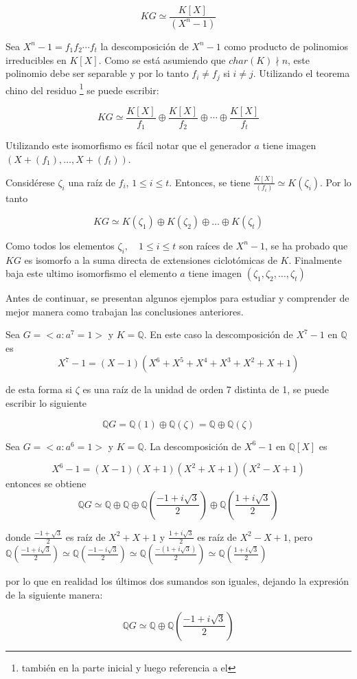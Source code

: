 \[KG \simeq \frac{K[X]}{(X^n -1 )} \]

Sea $ X^n -1 = f_1f_2\cdots f_t$ la descomposición de $X^n -1$ como producto de polinomios irreducibles en $K[X]$. Como se está asumiendo que $char(K) \nmid n$, este polinomio debe ser separable y por lo tanto $f_i \neq f_j$ si $i \neq j$. Utilizando el teorema chino del residuo \footnote{también en la parte inicial y luego referencia a el} se puede escribir:

\[KG \simeq \frac{K[X]}{f_1} \oplus \frac{K[X]}{f_2} \oplus \cdots \oplus \frac{K[X]}{f_t} \]


Utilizando este isomorfismo es fácil notar que el generador $a$ tiene imagen $( X + (f_1)  , \dots, X + (f_t) ) $. 

Considérese $\zeta_i$ una raíz de $f_i$, $1 \leq i \leq t$. Entonces, se tiene $\frac{K[X]}{(f_i)} \simeq K(\zeta_i)$. Por lo tanto

\[ KG \simeq K(\zeta_1) \oplus K(\zeta_2) \oplus \dots \oplus K(\zeta_t)  \]

Como todos los elementos $\zeta_i , \quad 1 \leq i \leq t$ son raíces de $X^n -1$, se ha probado que $KG$ es isomorfo a la suma directa de extensiones ciclotómicas de $K$. Finalmente baja este 
ultimo isomorfismo el elemento $a$ tiene imagen $(\zeta_1 , \zeta_2, \dots ,\zeta_t)$

Antes de continuar, se presentan algunos ejemplos para estudiar y comprender de mejor manera como trabajan las conclusiones anteriores.

\begin{ejemplo}\label{ejem:orden7}
Sea $G = < a \colon a^7 = 1>$ y $K = \mathds{Q} $. 
En este caso la descomposición de $ X^7 -1$ en $\mathds{Q}$ es 
\[ X^7 -1 = (X-1)(X^6 + X^5 + X^4 + X^3 + X^2 + X + 1) \]

de esta forma si $\zeta$ es una raíz de la unidad de orden 7 distinta de 1, se puede escribir lo siguiente

\[  \mathds{Q}G = \mathds{Q}(1) \oplus \mathds{Q}(\zeta) = \mathds{Q} \oplus \mathds{Q}(\zeta)   \]
\end{ejemplo}

\begin{ejemplo}
Sea $G = < a \colon a^6 = 1 >$ y $K = \mathds{Q}$. La descomposición de $X^6 - 1 $ en $\mathds{Q}[X]$ es 

\[ X^6 - 1 = (X-1)(X+1)(X^2 + X + 1)(X^2-X+1) \]
entonces se obtiene 
\[  \mathds{Q}G \simeq \mathds{Q} \oplus \mathds{Q} \oplus \mathds{Q}\left( \frac{-1+i\sqrt{3}}{2} \right) \oplus \mathds{Q}\left( \frac{1+i\sqrt{3}}{2} \right)   \]

donde $\frac{-1 + \sqrt{3}}{2}$ es raíz de $X^2+X+1$ y $\frac{1+i\sqrt{3}}{2}$ es raíz de $X^2-X+1$, pero $\mathds{Q}\left( \frac{-1+i\sqrt{3}}{2} \right) \simeq \mathds{Q}\left( \frac{-1-i\sqrt{3}}{2} \right) \simeq \mathds{Q}\left( \frac{-(1+i\sqrt{3})}{2} \right) \simeq \mathds{Q}\left( \frac{1+i\sqrt{3}}{2} \right)$

por lo que en realidad los últimos dos sumandos son iguales, dejando la expresión de la siguiente manera:

\[  \mathds{Q}G \simeq  \mathds{Q} \oplus \mathds{Q}\left( \frac{-1+i\sqrt{3}}{2} \right)   \]
\end{ejemplo}

